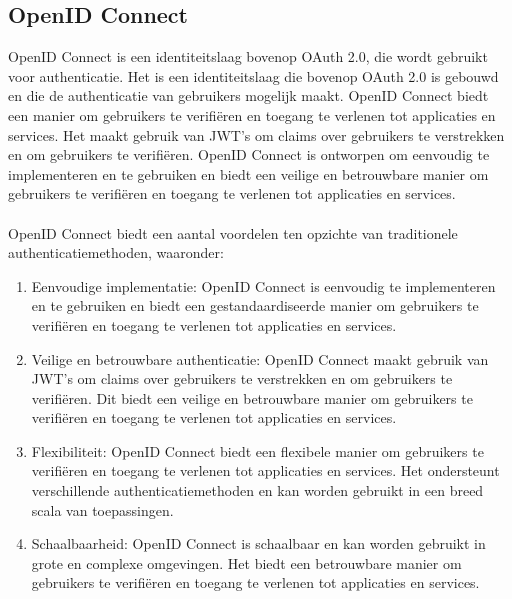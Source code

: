   \subsection{OpenID Connect}%
  \label{subsec:openid-connect}
  OpenID Connect is een identiteitslaag bovenop OAuth 2.0, die wordt gebruikt voor authenticatie. Het is een identiteitslaag die bovenop 
  OAuth 2.0 is gebouwd en die de authenticatie van gebruikers mogelijk maakt. OpenID Connect biedt een manier om gebruikers te verifiëren 
  en toegang te verlenen tot applicaties en services. Het maakt gebruik van JWT's om claims over gebruikers te verstrekken en om 
  gebruikers te verifiëren. OpenID Connect is ontworpen om eenvoudig te implementeren en te gebruiken en biedt een veilige en betrouwbare manier om 
  gebruikers te verifiëren en toegang te verlenen tot applicaties en services.
  \\
  \\
  OpenID Connect biedt een aantal voordelen ten opzichte van traditionele authenticatiemethoden, waaronder:
  \begin{enumerate}[label=\textbf{-}]
      \item Eenvoudige implementatie: OpenID Connect is eenvoudig te implementeren en te gebruiken en biedt een gestandaardiseerde manier om gebruikers te verifiëren en toegang te verlenen tot applicaties en services.
      \item Veilige en betrouwbare authenticatie: OpenID Connect maakt gebruik van JWT's om claims over gebruikers te verstrekken en om gebruikers te verifiëren. Dit biedt een veilige en betrouwbare manier om gebruikers te verifiëren en toegang te verlenen tot applicaties en services.
      \item Flexibiliteit: OpenID Connect biedt een flexibele manier om gebruikers te verifiëren en toegang te verlenen tot applicaties en services. Het ondersteunt verschillende authenticatiemethoden en kan worden gebruikt in een breed scala van toepassingen.
      \item Schaalbaarheid: OpenID Connect is schaalbaar en kan worden gebruikt in grote en complexe omgevingen. Het biedt een betrouwbare manier om gebruikers te verifiëren en toegang te verlenen tot applicaties en services.
  \end{enumerate}
  \autocite{Sakimura2014}


